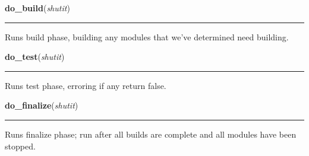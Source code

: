     \label{shutit_main:do_build}

    \vspace{0.5ex}

\hspace{.8\funcindent}\begin{boxedminipage}{\funcwidth}

    \raggedright \textbf{do\_build}(\textit{shutit})

    \vspace{-1.5ex}

    \rule{\textwidth}{0.5\fboxrule}
\setlength{\parskip}{2ex}
    Runs build phase, building any modules that we've determined need 
    building.

\setlength{\parskip}{1ex}
    \end{boxedminipage}

    \label{shutit_main:do_test}

    \vspace{0.5ex}

\hspace{.8\funcindent}\begin{boxedminipage}{\funcwidth}

    \raggedright \textbf{do\_test}(\textit{shutit})

    \vspace{-1.5ex}

    \rule{\textwidth}{0.5\fboxrule}
\setlength{\parskip}{2ex}
    Runs test phase, erroring if any return false.

\setlength{\parskip}{1ex}
    \end{boxedminipage}

    \label{shutit_main:do_finalize}

    \vspace{0.5ex}

\hspace{.8\funcindent}\begin{boxedminipage}{\funcwidth}

    \raggedright \textbf{do\_finalize}(\textit{shutit})

    \vspace{-1.5ex}

    \rule{\textwidth}{0.5\fboxrule}
\setlength{\parskip}{2ex}
    Runs finalize phase; run after all builds are complete and all modules 
    have been stopped.

\setlength{\parskip}{1ex}
    \end{boxedminipage}

